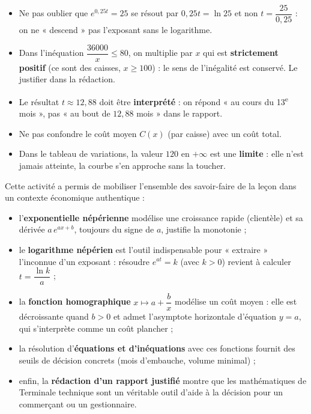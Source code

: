 \documentclass[11pt]{article}
\newcounter{popsec}
\newcounter{popsub}
\newcommand{\courssub}[1]{%
  \stepcounter{popsub}%
  \par\vspace{9pt}\noindent{\popxbold\fontsize{11.5}{13}\selectfont\color{popink}{\color{poporange}\thepopsec.\thepopsub}\hspace{6pt}#1}\par\nopagebreak\vspace{4pt}
}
\begin{document}
\begin{attention}
\begin{itemize}
\item Ne pas oublier que $e^{0{,}25t} = 25$ se résout par $0{,}25t = \ln 25$ et non $t = \dfrac{25}{0{,}25}$ : on ne « descend » pas l'exposant sans le logarithme.
\item Dans l'inéquation $\dfrac{36000}{x} \leq 80$, on multiplie par $x$ qui est \textbf{strictement positif} (ce sont des caisses, $x \geq 100$) : le sens de l'inégalité est conservé. Le justifier dans la rédaction.
\item Le résultat $t \approx 12{,}88$ doit être \textbf{interprété} : on répond « au cours du 13\textsuperscript{e} mois », pas « au bout de $12{,}88$ mois » dans le rapport.
\item Ne pas confondre le coût moyen $C(x)$ (par caisse) avec un coût total.
\item Dans le tableau de variations, la valeur $120$ en $+\infty$ est une \textbf{limite} : elle n'est jamais atteinte, la courbe s'en approche sans la toucher.
\end{itemize}
\end{attention}

\courssub{Bilan de l'activité}

Cette activité a permis de mobiliser l'ensemble des savoir-faire de la leçon dans un contexte économique authentique :
\begin{itemize}
\item l'\textbf{exponentielle népérienne} modélise une croissance rapide (clientèle) et sa dérivée $a\,e^{ax+b}$, toujours du signe de $a$, justifie la monotonie ;
\item le \textbf{logarithme népérien} est l'outil indispensable pour « extraire » l'inconnue d'un exposant : résoudre $e^{at} = k$ (avec $k > 0$) revient à calculer $t = \dfrac{\ln k}{a}$ ;
\item la \textbf{fonction homographique} $x \mapsto a + \dfrac{b}{x}$ modélise un coût moyen : elle est décroissante quand $b > 0$ et admet l'asymptote horizontale d'équation $y = a$, qui s'interprète comme un coût plancher ;
\item la résolution d'\textbf{équations et d'inéquations} avec ces fonctions fournit des seuils de décision concrets (mois d'embauche, volume minimal) ;
\item enfin, la \textbf{rédaction d'un rapport justifié} montre que les mathématiques de Terminale technique sont un véritable outil d'aide à la décision pour un commerçant ou un gestionnaire.
\end{itemize}
\end{document}
